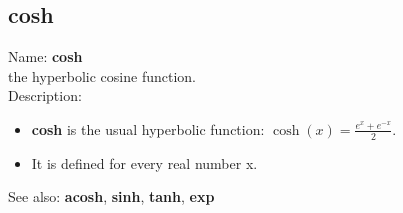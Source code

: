 \subsection{ cosh }
\noindent Name: \textbf{cosh}\\
the hyperbolic cosine function.\\

\noindent Description: \begin{itemize}

\item \textbf{cosh} is the usual hyperbolic function: $\cosh(x) = \frac{e^x + e^{-x}}{2}$.

\item It is defined for every real number x.
\end{itemize}
See also: \textbf{acosh}, \textbf{sinh}, \textbf{tanh}, \textbf{exp}
